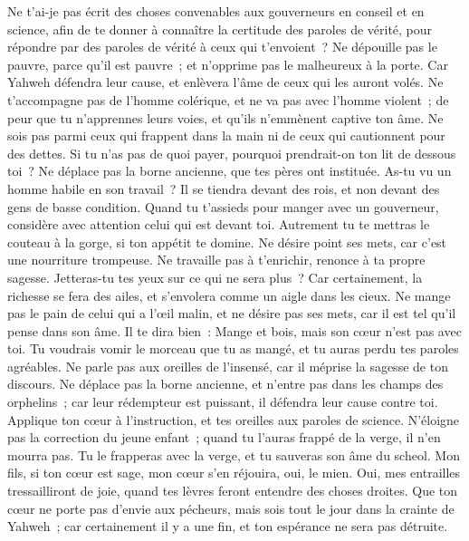 \begin{multicols}{2}
Ne t'ai-je pas écrit des choses convenables aux gouverneurs en conseil et en science,
afin de te donner à connaître la certitude des paroles de vérité, pour répondre par des paroles de vérité à ceux qui t'envoient~?
Ne dépouille pas le pauvre, parce qu'il est pauvre~; et n'opprime pas le malheureux à la porte.
Car Yahweh défendra leur cause, et enlèvera l'âme de ceux qui les auront volés.
Ne t'accompagne pas de l'homme colérique, et ne va pas avec l'homme violent~;
de peur que tu n'apprennes leurs voies, et qu'ils n'emmènent captive ton âme.
Ne sois pas parmi ceux qui frappent dans la main ni de ceux qui cautionnent pour des dettes.
Si tu n'as pas de quoi payer, pourquoi prendrait-on ton lit de dessous toi~?
Ne déplace pas la borne ancienne, que tes pères ont instituée.
As-tu vu un homme habile en son travail~? Il se tiendra devant des rois, et non devant des gens de basse condition.
\VerseOne{}Quand tu t'assieds pour manger avec un gouverneur, considère avec attention celui qui est devant toi.
Autrement tu te mettras le couteau à la gorge, si ton appétit te domine.
Ne désire point ses mets, car c'est une nourriture trompeuse.
Ne travaille pas à t'enrichir, renonce à ta propre sagesse.
Jetteras-tu tes yeux sur ce qui ne sera plus~? Car certainement, la richesse se fera des ailes, et s'envolera comme un aigle dans les cieux.
Ne mange pas le pain de celui qui a l'œil malin, et ne désire pas ses mets,
car il est tel qu'il pense dans son âme. Il te dira bien~: Mange et bois, mais son cœur n'est pas avec toi.
Tu voudrais vomir le morceau que tu as mangé, et tu auras perdu tes paroles agréables.
Ne parle pas aux oreilles de l'insensé, car il méprise la sagesse de ton discours.
Ne déplace pas la borne ancienne, et n'entre pas dans les champs des orphelins~;
car leur rédempteur est puissant, il défendra leur cause contre toi.
Applique ton cœur à l'instruction, et tes oreilles aux paroles de science.
N'éloigne pas la correction du jeune enfant~; quand tu l'auras frappé de la verge, il n'en mourra pas.
Tu le frapperas avec la verge, et tu sauveras son âme du scheol.
Mon fils, si ton cœur est sage, mon cœur s'en réjouira, oui, le mien.
Oui, mes entrailles tressailliront de joie, quand tes lèvres feront entendre des choses droites.
Que ton cœur ne porte pas d'envie aux pécheurs, mais sois tout le jour dans la crainte de Yahweh~;
car certainement il y a une fin, et ton espérance ne sera pas détruite.

\end{multicols}
